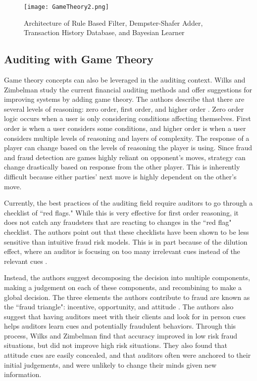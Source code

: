 \documentclass[midd]{thesis}
\begin{document}
\begin{figure} \centering
  \texttt{[image: GameTheory2.png]}
  \caption[Architecture of Game Theory Models]{Architecture of Rule Based Filter, Dempster-Shafer Adder, Transaction History Database, and Bayesian Learner}
  \label{fig:gametheory2}
\end{figure}


\subsection{Auditing with Game Theory}

Game theory concepts can also be leveraged in the auditing context. Wilks and Zimbelman study the current financial auditing methods and offer suggestions for improving systems by adding game theory. The authors describe that there are several levels of reasoning: zero order, first order, and higher order \cite{Wilks2004}. Zero order logic occurs when a user is only considering conditions affecting themselves. First order is when a user considers some conditions, and higher order is when a user considers multiple levels of reasoning and layers of complexity. The response of a player can change based on the levels of reasoning the player is using. Since fraud and fraud detection are games highly reliant on opponent's moves, strategy can change drastically based on response from the other player. This is inherently difficult because either parties' next move is highly dependent on the other's move. 

Currently, the best practices of the auditing field require auditors to go through a checklist of ``red flags." While this is very effective for first order reasoning, it does not catch any fraudsters that are reacting to changes in the ``red flag" checklist. The authors point out that these checklists have been shown to be less sensitive than intuitive fraud risk models. This is in part because of the dilution effect, where an auditor is focusing on too many irrelevant cues instead of the relevant cues \cite{Wilks2004}. 

Instead, the authors suggest decomposing the decision into multiple components, making a judgement on each of these components, and recombining to make a global decision. The three elements the authors contribute to fraud are known as the ``fraud triangle": incentive, opportunity, and attitude \cite{Wilks2004}. The authors also suggest that having auditors meet with their clients and look for in person cues helps auditors learn cues and potentially fraudulent behaviors. Through this process, Wilks and Zimbelman find that accuracy improved in low risk fraud situations, but did not improve high risk situations. They also found that attitude cues are easily concealed, and that auditors often were anchored to their initial judgements, and were unlikely to change their minds given new information.
\end{document}
